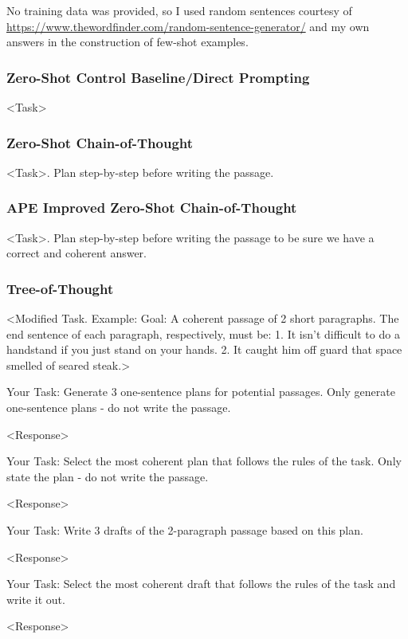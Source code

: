 \documentclass[11pt]{article}
\begin{document}
No training data was provided, so I used random sentences courtesy of \url{https://www.thewordfinder.com/random-sentence-generator/} and my own answers in the construction of few-shot examples.

\subsubsection*{Zero-Shot Control Baseline/Direct Prompting}

<Task>

\subsubsection*{Zero-Shot Chain-of-Thought}

<Task>. Plan step-by-step before writing the passage.

\subsubsection*{APE Improved Zero-Shot Chain-of-Thought}

<Task>. Plan step-by-step before writing the passage to be sure we have a correct and coherent answer.

\subsubsection*{Tree-of-Thought}

<Modified Task. Example: Goal: A coherent passage of 2 short paragraphs. The end sentence of each paragraph, respectively, must be: 1. It isn't difficult to do a handstand if you just stand on your hands. 2. It caught him off guard that space smelled of seared steak.>

Your Task: Generate 3 one-sentence plans for potential passages. Only generate one-sentence plans - do not write the passage.

<Response>

Your Task: Select the most coherent plan that follows the rules of the task. Only state the plan - do not write the passage.

<Response>

Your Task: Write 3 drafts of the 2-paragraph passage based on this plan.

<Response>

Your Task: Select the most coherent draft that follows the rules of the task and write it out.

<Response>
\end{document}
